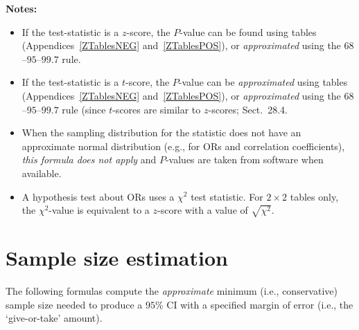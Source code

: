 \documentclass[
  11pt,
  a4paper,
  krantz2]{krantz}
\providecommand{\tightlist}{%
  \setlength{\itemsep}{0pt}\setlength{\parskip}{0pt}}
\begin{document}
\textbf{Notes:}

\begin{itemize}
\tightlist
\item
  If the test-statistic is a \(z\)-score, the \(P\)-value can be found using tables
  (Appendices~\ref{ZTablesNEG} and~\ref{ZTablesPOS}),
  or \emph{approximated} using the \(68\)--\(95\)--\(99.7\) rule.
\item
  If the test-statistic is a \(t\)-score, the \(P\)-value can be \emph{approximated} using tables
  (Appendices~\ref{ZTablesNEG} and~\ref{ZTablesPOS}),
  or \emph{approximated} using the \(68\)--\(95\)--\(99.7\) rule (since \(t\)-scores are similar to \(z\)-scores; Sect.~28.4.
\item
  When the sampling distribution for the statistic does not have an approximate normal distribution (e.g., for ORs and correlation coefficients), \emph{this formula does not apply} and \(P\)-values are taken from software when available.
\item
  A hypothesis test about ORs uses a \(\chi^2\) test statistic.
  For \(2\times 2\) tables only, the \(\chi^2\)-value is equivalent to a \(z\)-score with a value of \(\sqrt{\chi^2}\).
\end{itemize}

\pagebreak

\section{Sample size estimation}\label{FormulasSampleSize}

The following formulas compute the \emph{approximate} minimum (i.e., conservative) sample size needed to produce a \(95\)\% CI with a specified margin of error (i.e., the `give-or-take' amount).
\end{document}

